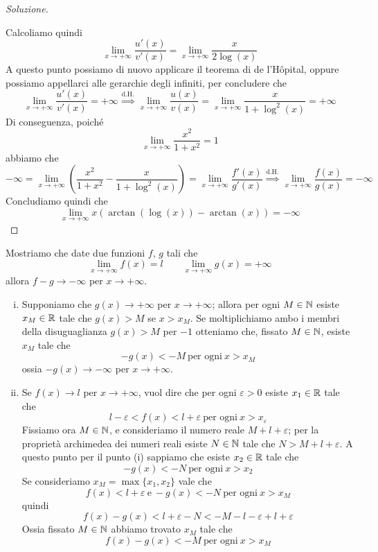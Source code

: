 \begin{proof}[Soluzione]
\begin{enumerate}[(i)]
    \end{enumerate}
    Calcoliamo quindi
    \[
    \lim_{x\to+\infty} \frac{u'(x)}{v'(x)} = \lim_{x\to +\infty} \frac{x}{2\log(x)}
    \]
    A questo punto possiamo di nuovo applicare il teorema di de l'H{\^o}pital, oppure possiamo appellarci alle gerarchie degli infiniti, per concludere che
    \[
    \lim_{x\to+\infty}\frac{u'(x)}{v'(x)} = +\infty \overset{\text{d.H.}}{\implies} \lim_{x\to+\infty} \frac{u(x)}{v(x)} = \lim_{x\to+\infty} \frac{x}{1+\log^2(x)} = +\infty
    \]
    Di conseguenza, poiché
    \[
    \lim_{x\to+\infty}\frac{x^2}{1+x^2} = 1
    \]
    abbiamo che
    \[
    -\infty = \lim_{x\to +\infty} \left(\frac{x^2}{1+x^2}-\frac{x}{1+\log^2(x)}\right) = \lim_{x\to+\infty} \frac{f'(x)}{g'(x)} \overset{\text{d.H.}}{\implies} \lim_{x\to+\infty} \frac{f(x)}{g(x)} = -\infty
    \]
    Concludiamo quindi che
    \[
    \lim_{x\to +\infty} x\left(\arctan(\log(x))-\arctan(x)\right) = -\infty
    \]
\end{proof}
\begin{remark}
    Mostriamo che date due funzioni $f$, $g$ tali che 
    \[
    \lim_{x\to+\infty} f(x) = l \qquad \lim_{x\to+\infty} g(x) = +\infty
    \]
    allora $f-g\to -\infty$ per $x\to+\infty$.
    \begin{enumerate}[(i)]
        \item Supponiamo che $g(x)\to +\infty$ per $x\to+\infty$; allora per ogni $M\in\amsbb{N}$ esiste $x_M\in\amsbb{R}$ tale che $g(x)>M$ se $x>x_M$. Se moltiplichiamo ambo i membri della disuguaglianza $g(x)>M$ per $-1$ otteniamo che, fissato $M\in\amsbb{N}$, esiste $x_M$ tale che
        \[
        -g(x)<-M \ \text{per ogni} \ x>x_M
        \]
        ossia $-g(x)\to-\infty$ per $x\to+\infty$.
        \item Se $f(x)\to l$ per $x\to+\infty$, vuol dire che per ogni $\varepsilon>0$ esiste $x_1\in\amsbb{R}$ tale che
        \[
        l-\varepsilon < f(x) <l+\varepsilon \ \text{per ogni} \ x> x_\varepsilon
        \]
        Fissiamo ora $M\in\amsbb{N}$, e consideriamo il numero reale $M+l+\varepsilon$; per la proprietà archimedea dei numeri reali esiste $N\in\amsbb{N}$ tale che $N>M+l+\varepsilon$. A questo punto per il punto (i) sappiamo che esiste $x_2\in\amsbb{R}$ tale che
        \[
        -g(x)<-N\ \text{per ogni} \ x>x_2
        \]
        Se consideriamo $x_M = \max\{x_1, x_2\}$ vale che
        \[
        f(x)<l+\varepsilon \ \text{e} \ -g(x)<-N \ \text{per ogni} \ x> x_M
        \]
        quindi
        \[
        f(x)-g(x)<l+\varepsilon -N < -M-l-\varepsilon+l+\varepsilon
        \]
        Ossia fissato $M\in\amsbb{N}$ abbiamo trovato $x_M$ tale che
        \[
        f(x)-g(x)<-M \ \text{per ogni} \ x>x_M
        \]
    \end{enumerate}
\end{remark}
